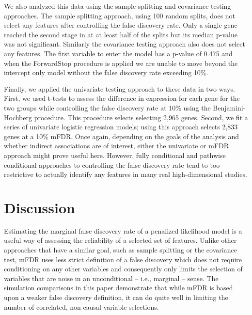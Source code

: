 

We also analyzed this data using the sample splitting and covariance testing approaches.  The sample splitting approach, using 100 random splits, does not select any features after controlling the false discovery rate. Only a single gene reached the second stage in at at least half of the splits but its median p-value was not significant. Similarly the covariance testing approach also does not select any features.  The first variable to enter the model has a p-value of 0.475 and when the ForwardStop procedure is applied we are unable to move beyond the intercept only model without the false discovery rate exceeding 10\%.

Finally, we applied the univariate testing approach to these data in two ways. First, we used t-tests to assess the difference in expression for each gene for the two groups while controlling the false discovery rate at 10\% using the Benjamini-Hochberg procedure.  This procedure selects selecting 2,965 genes. Second, we fit a series of univariate logistic regression models; using this approach selects 2,833 genes at a 10\% mFDR. Once again, depending on the goals of the analysis and whether indirect associations are of interest, either the univariate or mFDR approach might prove useful here.  However, fully conditional and pathwise conditional approaches to controlling the false discovery rate tend to too restrictive to actually identify any features in many real high-dimensional studies.

\section{Discussion}

Estimating the marginal false discovery rate of a penalized likelihood model is a useful way of assessing the reliability of a selected set of features. Unlike other approaches that have a similar goal, such as sample splitting or the covariance test, mFDR uses less strict definition of a false discovery which does not require conditioning on any other variables and consequently only limits the selection of variables that are noise in an unconditional -- i.e., marginal -- sense.  The simulation comparisons in this paper demonstrate that while mFDR is based upon a weaker false discovery definition, it can do quite well in limiting the number of correlated, non-causal variable selections.

